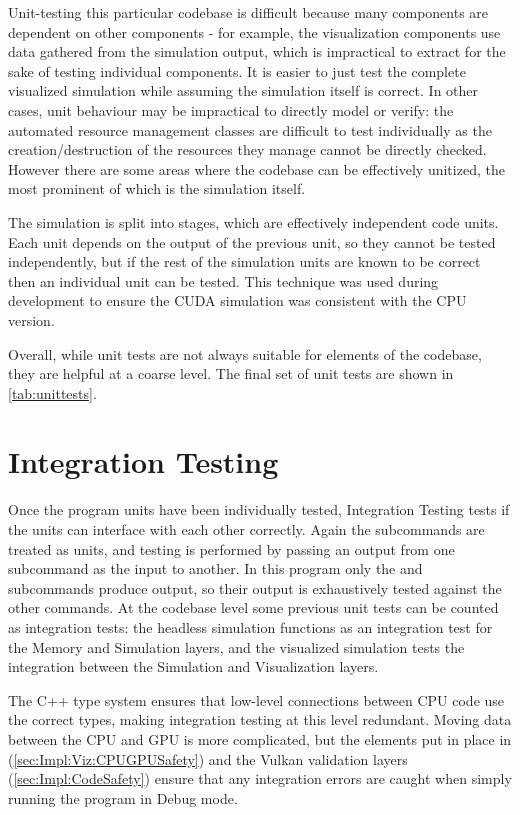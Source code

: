 Unit-testing this particular codebase is difficult because many components are dependent on other components - for example, the visualization components use data gathered from the simulation output, which is impractical to extract for the sake of testing individual components.
It is easier to just test the complete visualized simulation while assuming the simulation itself is correct.
In other cases, unit behaviour may be impractical to directly model or verify: the automated resource management classes are difficult to test individually as the creation/destruction of the resources they manage cannot be directly checked.
However there are some areas where the codebase can be effectively unitized, the most prominent of which is the simulation itself.

The simulation is split into stages, which are effectively independent code units.
Each unit depends on the output of the previous unit, so they cannot be tested independently, but if the rest of the simulation units are known to be correct then an individual unit can be tested.
This technique was used during development to ensure the CUDA simulation was consistent with the CPU version.

Overall, while unit tests are not always suitable for elements of the codebase, they are helpful at a coarse level.
The final set of unit tests are shown in \cref{tab:unittests}.

\section{Integration Testing}
Once the program units have been individually tested, Integration Testing tests if the units can interface with each other correctly.
Again the subcommands are treated as units, and testing is performed by passing an output from one subcommand as the input to another.
In this program only the  and  subcommands produce output, so their output is exhaustively tested against the other commands.
At the codebase level some previous unit tests can be counted as integration tests:
the headless simulation functions as an integration test for the Memory and Simulation layers, and the visualized simulation tests the integration between the Simulation and Visualization layers.

The C++ type system ensures that low-level connections between CPU code use the correct types, making integration testing at this level redundant.
Moving data between the CPU and GPU is more complicated, but the elements put in place in (\cref{sec:Impl:Viz:CPUGPUSafety}) and the Vulkan validation layers (\cref{sec:Impl:CodeSafety}) ensure that any integration errors are caught when simply running the program in Debug mode.

